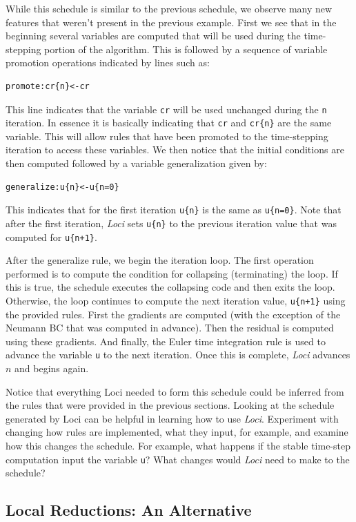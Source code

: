 \documentclass[10pt,epsf,letterpaper,twoside]{book}
\begin{document}
While this schedule is similar to the previous schedule, we observe
many new features that weren't present in the previous example.  First
we see that in the beginning several variables are computed that will
be used during the time-stepping portion of the algorithm.  This is
followed by a sequence of variable promotion operations indicated by
lines such as:
\begin{verbatim}
promote:cr{n}<-cr
\end{verbatim}
This line indicates that the variable {\tt cr} will be used unchanged
during the {\tt n} iteration.  In essence it is basically indicating
that {\tt cr} and {\tt cr\{n\}} are the same variable.  This will
allow rules that have been promoted to the time-stepping iteration to
access these variables.  We then notice that the initial conditions
are then computed followed by a variable generalization given by:
\begin{verbatim}
generalize:u{n}<-u{n=0}
\end{verbatim}
This indicates that for the first iteration {\tt u\{n\}} is the same
as {\tt u\{n=0\}}.  Note that after the first iteration, {\it Loci}
sets {\tt u\{n\}} to the previous iteration value that was computed
for {\tt u\{n+1\}}.  

After the generalize rule, we begin the iteration loop.  The first
operation performed is to compute the condition for collapsing
(terminating) the loop.  If this is true, the schedule executes the
collapsing code and then exits the loop.  Otherwise, the loop
continues to compute the next iteration value, {\tt u\{n+1\}} using
the provided rules.  First the gradients are computed (with the
exception of the Neumann BC that was computed in advance).  Then the
residual is computed using these gradients.  And finally, the Euler
time integration rule is used to advance the variable {\tt u} to the
next iteration.  Once this is complete, {\it Loci} advances $n$ and
begins again.

Notice that everything Loci needed to form this schedule could be
inferred from the rules that were provided in the previous sections.
Looking at the schedule generated by Loci can be helpful in learning
how to use {\it Loci}.  Experiment with changing how rules are
implemented, what they input, for example, and examine how this
changes the schedule.  For example, what happens if the stable
time-step computation input the variable {\tt u}?  What changes would
{\it Loci} need to make to the schedule?

\subsection{Local Reductions: An Alternative}
\end{document}
